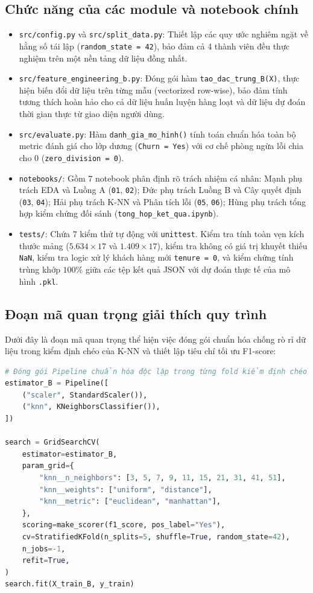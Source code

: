\documentclass[12pt,a4paper]{article}
\begin{document}
\subsection{Chức năng của các module và notebook chính}
\begin{itemize}
    \item \texttt{src/config.py} và \texttt{src/split_data.py}: Thiết lập các quy ước nghiêm ngặt về hằng số tái lập (\texttt{random\_state = 42}), bảo đảm cả 4 thành viên đều thực nghiệm trên một nền tảng dữ liệu đồng nhất.
    \item \texttt{src/feature_engineering_b.py}: Đóng gói hàm \texttt{tao\_dac\_trung\_B(X)}, thực hiện biến đổi dữ liệu trên từng mẫu (vectorized row-wise), bảo đảm tính tương thích hoàn hảo cho cả dữ liệu huấn luyện hàng loạt và dữ liệu dự đoán thời gian thực từ giao diện người dùng.
    \item \texttt{src/evaluate.py}: Hàm \texttt{danh\_gia\_mo\_hinh()} tính toán chuẩn hóa toàn bộ metric đánh giá cho lớp dương (\texttt{Churn = Yes}) với cơ chế phòng ngừa lỗi chia cho 0 (\texttt{zero\_division = 0}).
    \item \texttt{notebooks/}: Gồm 7 notebook phân định rõ trách nhiệm cá nhân: Mạnh phụ trách EDA và Luồng A (\texttt{01}, \texttt{02}); Đức phụ trách Luồng B và Cây quyết định (\texttt{03}, \texttt{04}); Hải phụ trách K-NN và Phân tích lỗi (\texttt{05}, \texttt{06}); Hùng phụ trách tổng hợp kiểm chứng đối sánh (\texttt{tong\_hop\_ket\_qua.ipynb}).
    \item \texttt{tests/}: Chứa 7 kiểm thử tự động với \texttt{unittest}. Kiểm tra tính toàn vẹn kích thước mảng ($5.634 \times 17$ và $1.409 \times 17$), kiểm tra không có giá trị khuyết thiếu \texttt{NaN}, kiểm tra logic xử lý khách hàng mới \texttt{tenure = 0}, và kiểm chứng tính trùng khớp $100\%$ giữa các tệp kết quả JSON với dự đoán thực tế của mô hình \texttt{.pkl}.
\end{itemize}

\subsection{Đoạn mã quan trọng giải thích quy trình}
Dưới đây là đoạn mã quan trọng thể hiện việc đóng gói chuẩn hóa chống rò rỉ dữ liệu trong kiểm định chéo của K-NN và thiết lập tiêu chí tối ưu F1-score:

\begin{lstlisting}[language=Python,basicstyle=\ttfamily\footnotesize,frame=single,keywordstyle=\color{blue}]
# Đóng gói Pipeline chuẩn hóa độc lập trong từng fold kiểm định chéo
estimator_B = Pipeline([
    ("scaler", StandardScaler()),
    ("knn", KNeighborsClassifier()),
])

search = GridSearchCV(
    estimator=estimator_B,
    param_grid={
        "knn__n_neighbors": [3, 5, 7, 9, 11, 15, 21, 31, 41, 51],
        "knn__weights": ["uniform", "distance"],
        "knn__metric": ["euclidean", "manhattan"],
    },
    scoring=make_scorer(f1_score, pos_label="Yes"),
    cv=StratifiedKFold(n_splits=5, shuffle=True, random_state=42),
    n_jobs=-1,
    refit=True,
)
search.fit(X_train_B, y_train)
\end{lstlisting}
\end{document}
